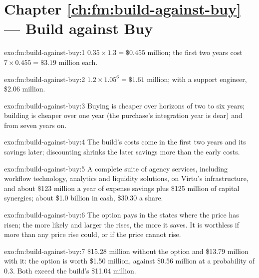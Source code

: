 \section*{Chapter \ref{ch:fm:build-against-buy} --- Build against Buy}

\begin{solution}{exo:fm:build-against-buy:1}
$0.35\times1.3=\$0.455$ million; the first two years cost $7\times0.455=\$3.19$ million each.
\end{solution}

\begin{solution}{exo:fm:build-against-buy:2}
$1.2\times1.05^6=\$1.61$ million; with a support engineer, \$2.06 million.
\end{solution}

\begin{solution}{exo:fm:build-against-buy:3}
Buying is cheaper over horizons of two to six years; building is cheaper over one year (the purchase's integration year is dear) and from seven
years on.
\end{solution}

\begin{solution}{exo:fm:build-against-buy:4}
The build's costs come in the first two years and its savings later; discounting shrinks the later savings more than the early costs.
\end{solution}

\begin{solution}{exo:fm:build-against-buy:5}
A complete suite of agency services, including workflow technology, analytics and liquidity solutions, on Virtu's infrastructure, and about
\$123 million a year of expense savings plus \$125 million of capital synergies; about \$1.0 billion in cash, \$30.30 a share.
\end{solution}

\begin{solution}{exo:fm:build-against-buy:6}
The option pays in the states where the price has risen; the more likely and larger the rises, the more it saves. It is worthless if  more than any price rise could, or if the price cannot rise.
\end{solution}

\begin{solution}{exo:fm:build-against-buy:7}
\$15.28 million without the option and \$13.79 million with it: the option is worth \$1.50 million, against \$0.56 million at a probability of 0.3.
Both exceed the build's \$11.04 million.
\end{solution}

